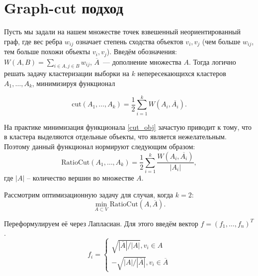 \documentclass[12pt,a4paper]{article}
\begin{document}
\section{Graph-cut подход}

Пусть мы задали на нашем множестве точек взвешенный неориентированный граф, где вес ребра $w_{ij}$ означает степень сходства объектов $v_i,v_j$ (чем больше $w_{ij}$, тем больше похожи объекты $v_i,v_j$). Введём обозначения: $W(A,B) = \sum_{i\in A, j \in B} w_{ij}$, $\overline{A}$~--- дополнение множества $A$. Тогда логично решать задачу кластеризации выборки на $k$ непересекающихся кластеров $A_1, \ldots, A_k$, минимизируя функционал

\begin{equation}
	\text{cut}(A_1, \ldots, A_k) = \frac{1}{2}\sum_{i=1}^k W(A_i, \overline{A_i}).
	\label{cut_obj}
\end{equation}

На практике минимизация функционала \ref{cut_obj} зачастую приводит к тому, что в кластера выделяются отдельные объекты, что является нежелательным. Поэтому данный функционал нормируют следующим образом:
\begin{equation}
	\text{RatioCut}(A_1, \ldots, A_k) = \frac{1}{2}\sum_{i=1}^k \frac{W(A_i, \overline{A_i})}{|A_i|},
	\label{ratiocut_obj}
\end{equation}
где $|A|$ – количество вершин во множестве $A$.


Рассмотрим оптимизационную задачу для случая, когда $k=2$:
\begin{equation*}
	\min_{A \subset V} \text{RatioCut}(A, \overline{A}).
\end{equation*}

Переформулируем её через Лапласиан. Для этого введём вектор $f = (f_1, \ldots, f_n)^T$.
\begin{equation*}
	f_i = 
	\begin{cases}
		\sqrt{|\overline{A}|/|A|}, v_i \in A \\
		-\sqrt{|A|/|\overline{A}|}, v_i \in \overline{A}
	\end{cases}
\end{equation*}
\end{document}
